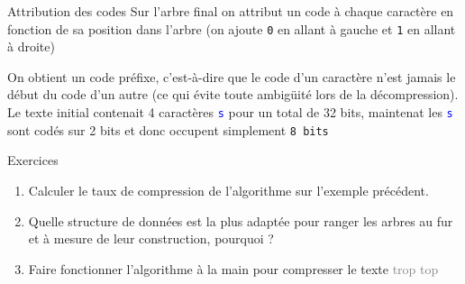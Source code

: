 \documentclass[10pt]{beamer}
\begin{document}
\begin{frame}{\Ctitle}{\stitle}
	\begin{block}{Attribution des codes}
		Sur l'arbre final on attribut un code à chaque caractère en fonction de sa position dans l'arbre (on ajoute \textcolor{OliveGreen}{\tt 0} en allant à gauche et \textcolor{OliveGreen}{\tt 1} en allant à droite)
		\begin{center}
			 \vspace{0.7cm}
		\end{center}
		On obtient un \textcolor{BrickRed}{code préfixe}, c'est-à-dire que le code d'un caractère n'est jamais le début du code d'un autre (ce qui évite toute ambigüité lors de la décompression).
		Le texte initial contenait 4 caractères \textcolor{blue}{\tt s} pour un total de 32 bits, maintenat les \textcolor{blue}{\tt s} sont codés sur 2 bits et donc  occupent simplement {\tt 8 bits}
	\end{block}
\end{frame}

\begin{frame}{\Ctitle}{\stitle}
	\begin{exampleblock}{Exercices}
		\begin{enumerate}
			\item <1-> Calculer le taux de compression de l'algorithme sur l'exemple précédent.
			\item <2-> Quelle structure de données est la plus adaptée pour ranger les arbres au fur et à mesure de leur construction, pourquoi ?
			\item <3-> Faire fonctionner l'algorithme à la main pour compresser le texte \og{}\textcolor{gray}{trop top}\fg{}
		\end{enumerate}
	\end{exampleblock}
\end{frame}
\end{document}
